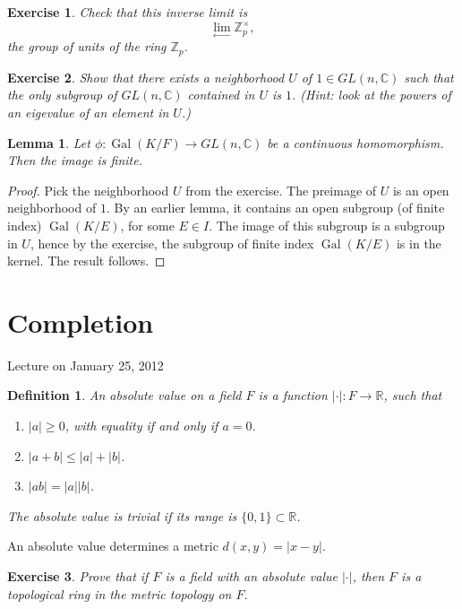 \documentclass{amsart}
\def\op#1{{\operatorname{#1}}}
\newcommand{\ring}[1]{\mathbb{#1}}
\newtheorem{definition}[equation]{Definition}
\newtheorem{lemma}[equation]{Lemma}
\newtheorem{exercise}{Exercise}
\def\newterm#1{{\it #1}}
\def\abs#1{{|#1|}}
\begin{document}
\begin{exercise}
Check that this inverse limit is
\[
\lim_{\leftarrow} \ring{Z}_p^\times,
\]
the group of units of the ring $\ring{Z}_p$.
\end{exercise}

\begin{exercise}  Show that there exists a neighborhood $U$ of $1\in GL(n,\ring{C})$
such that the only subgroup of $GL(n,\ring{C})$ contained in $U$ is $1$.
(Hint: look at the powers of an eigevalue of an element in $U$.)
\end{exercise}

\begin{lemma} Let $\phi:\op{Gal}(K/F)\to GL(n,\ring{C})$ be a continuous homomorphism.
Then the image is finite.
\end{lemma}

\begin{proof}  Pick the neighborhood $U$ from the exercise.  The preimage of $U$
is an open neighborhood of $1$.  By an earlier lemma, it contains an open subgroup
(of finite index)
$\op{Gal}(K/E)$, for some $E\in I$.  The image of this subgroup is a subgroup
in $U$, hence by the exercise, the subgroup of finite index
$\op{Gal}(K/E)$ is in the kernel.  The result follows.
\end{proof}





\newpage
\section{Completion}

Lecture on January 25, 2012

\begin{definition} An \newterm{absolute value} on a field $F$ is a function
$\abs{\cdot}:F\to \ring{R}$, such that
\begin{enumerate}
\item $\abs{a}\ge 0$, with equality if and only if $a=0$.
\item $\abs{a + b}\le \abs{a} + \abs{b}$.
\item $\abs{a b} = \abs{a}\abs{b}$.
\end{enumerate}
The absolute value is \newterm{trivial} if its range is $\{0,1\}\subset\ring{R}$.
\end{definition}

An absolute value determines a metric $d(x,y) = \abs{x-y}$.

\begin{exercise} Prove that if $F$ is a field with an absolute value
  $\abs{\cdot}$, then $F$ is a topological ring in the metric topology
  on $F$.
\end{exercise}
\end{document}
